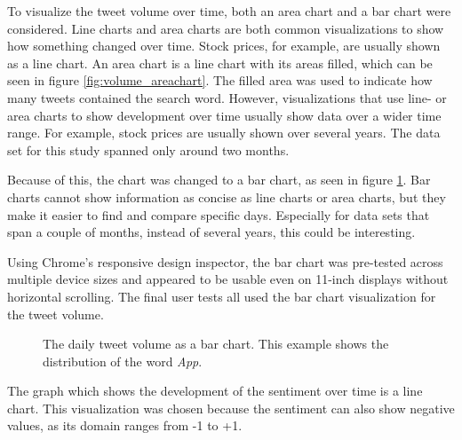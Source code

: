 To visualize the tweet volume over time, both an area chart and a bar chart were considered. Line charts and area charts are both common visualizations to show how something changed over time. Stock prices, for example, are usually shown as a line chart. An area chart is a line chart with its areas filled, which can be seen in figure \ref{fig:volume_areachart}. The filled area was used to indicate how many tweets contained the search word. However, visualizations that use line- or area charts to show development over time usually show data over a wider time range. For example, stock prices are usually shown over several years. The data set for this study spanned only around two months.

Because of this, the chart was changed to a bar chart, as seen in figure \ref{fig:volume_barchart}. Bar charts cannot show information as concise as line charts or area charts, but they make it easier to find and compare specific days. Especially for data sets that span a couple of months, instead of several years, this could be interesting.

Using Chrome's responsive design inspector, the bar chart was pre-tested across multiple device sizes and appeared to be usable even on 11-inch displays without horizontal scrolling. The final user tests all used the bar chart visualization for the tweet volume.

\begin{figure}[h!tb]
    \caption{The daily tweet volume as a bar chart. This example shows the distribution of the word \emph{App}.}
    \label{fig:volume_barchart}
\end{figure}

The graph which shows the development of the sentiment over time is a line chart. This visualization was chosen because the sentiment can also show negative values, as its domain ranges from -1 to +1. 

